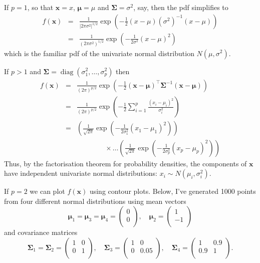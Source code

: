 \documentclass[]{book}
\theoremstyle{definition}
\theoremstyle{definition}
\theoremstyle{definition}
\theoremstyle{remark}
\begin{document}
If \(p=1\), so that \(\boldsymbol x= x\), \(\boldsymbol \mu= \mu\) and \(\boldsymbol \Sigma= \sigma^2\), say, then the pdf simplifies to
\begin{eqnarray*}
f(\boldsymbol x) &=& \frac{1}{|2 \pi \sigma^2|^{1/2}} \exp \left(-\frac{1}{2}(x - \mu) (\sigma^2)^{-1} (x - \mu) \right)\\
&=& \frac{1}{(2 \pi \sigma^2)^{1/2}} \exp \left(-\frac{1}{2 \sigma^2}(x - \mu)^2 \right)
\end{eqnarray*}
which is the familiar pdf of the univariate normal distribution \(N(\mu,\sigma^2)\).

If \(p>1\) and \(\boldsymbol \Sigma= \operatorname{diag}(\sigma_1^2, \ldots, \sigma_p^2)\) then
\begin{eqnarray*}
f(\boldsymbol x) &=& \frac{1}{(2 \pi)^{p/2}} \exp \left(-\frac{1}{2}(\boldsymbol x- \boldsymbol \mu)^\top \boldsymbol \Sigma^{-1}(\boldsymbol x- \boldsymbol \mu) \right)\\
&=& \frac{1}{(2 \pi)^{p/2}} \exp \left(-\frac{1}{2} \sum_{i=1}^p \frac{(x_i - \mu_i)^2}{\sigma_i^2} \right)\\
&=& \left(\frac{1}{\sqrt{2 \pi}} \exp \left(-\frac{1}{2\sigma_1^2} (x_1 - \mu_1)^2 \right)\right)\\
 && \qquad \qquad \times \ldots \left(\frac{1}{\sqrt{2 \pi}} \exp \left(-\frac{1}{2\sigma_p^2} (x_p - \mu_p)^2 \right)\right)
\end{eqnarray*}
Thus, by the factorisation theorem for probability densities, the components of \(\boldsymbol x\) have independent univariate normal distributions: \(x_i \sim N(\mu_i, \sigma_i^2)\).

If \(p=2\) we can plot \(f(\boldsymbol x)\) using contour plots. Below, I've generated 1000 points from four different normal distributions using mean vectors
\[\boldsymbol \mu_1=\boldsymbol \mu_3=\boldsymbol \mu_4=\begin{pmatrix}0 \\0 \\\end{pmatrix}, \quad \boldsymbol \mu_2=\begin{pmatrix}1 \\-1 \\\end{pmatrix}\]
and covariance matrices
\[\boldsymbol \Sigma_1=\boldsymbol \Sigma_2=\begin{pmatrix}1&0 \\0&1 \\\end{pmatrix}, \quad \boldsymbol \Sigma_3=\begin{pmatrix}1&0 \\0&0.05 \\\end{pmatrix}, \quad \boldsymbol \Sigma_4=\begin{pmatrix}1&0.9 \\0.9&1 \\\end{pmatrix}.\]
\end{document}
